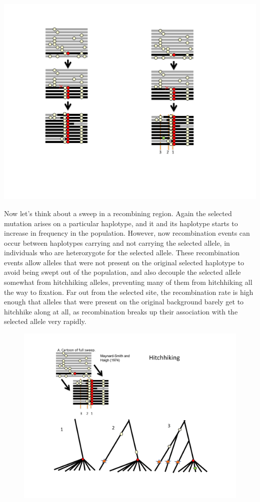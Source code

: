 \begin{marginfigure}
\begin{center}
\includegraphics[width= 0.5 \textwidth]{figures/Hitchhiking/recom_haps_sweep.pdf}
\end{center}
\caption{} \label{fig:sweep_haps}
\end{marginfigure}
Now let's think about a sweep in a recombining region. Again the
selected mutation arises on a particular haplotype, and it and its
haplotype starts to increase in frequency in the population. However,
now recombination events can occur between haplotypes carrying and not
carrying the selected allele, in individuals who are heterozygote for
the selected allele. These recombination events allow alleles that
were not present on the original selected haplotype to avoid being
swept out of the population, and also decouple the selected allele
somewhat from hitchhiking alleles, preventing many of them from hitchhiking all the way to fixation. Far out from the selected site, the recombination
rate is high enough that alleles that were present on the original
background barely get to hitchhike along at all, as recombination breaks up their association with the selected allele very rapidly.

\begin{figure}
\begin{center}
\includegraphics[width= 0.9 \textwidth]{figures/Hitchhiking/recom_haps_coal_sweep.pdf}
\end{center}
\caption{} \label{fig:sweep_haps_coal}
\end{figure}

